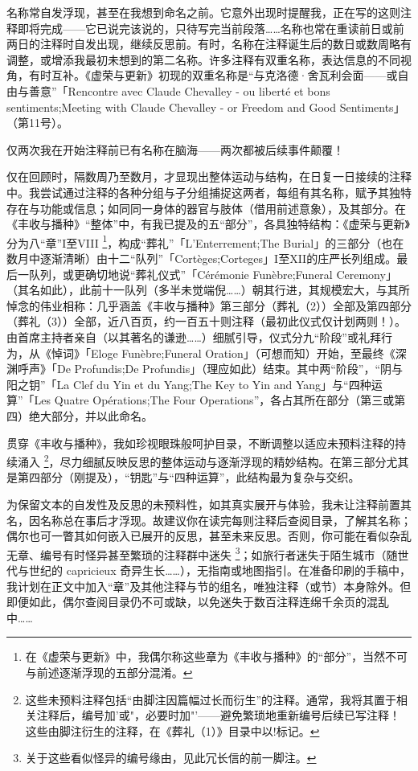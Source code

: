 名称常自发浮现，甚至在我想到命名之前。它意外出现时提醒我，正在写的这则注释即将完成——它已说完该说的，只待写完当前段落……名称也常在重读前日或前两日的注释时自发出现，继续反思前。有时，名称在注释诞生后的数日或数周略有调整，或增添我最初未想到的第二名称。许多注释有双重名称，表达信息的不同视角，有时互补。《虚荣与更新》初现的双重名称是“与克洛德·舍瓦利会面——或自由与善意”「Rencontre avec Claude Chevalley - ou liberté et bons sentiments;Meeting with Claude Chevalley - or Freedom and Good Sentiments」（第11号）。

仅两次我在开始注释前已有名称在脑海——两次都被后续事件颠覆！

仅在回顾时，隔数周乃至数月，才显现出整体运动与结构，在日复一日接续的注释中。我尝试通过注释的各种分组与子分组捕捉这两者，每组有其名称，赋予其独特存在与功能或信息；如同同一身体的器官与肢体（借用前述意象），及其部分。在《丰收与播种》“整体”中，有我已提及的五“部分”，各具独特结构：《虚荣与更新》分为八“章”I至VIII \footnote{在《虚荣与更新》中，我偶尔称这些章为《丰收与播种》的“部分”，当然不可与前述逐渐浮现的五部分混淆。}，构成“葬礼”「L'Enterrement;The Burial」的三部分（也在数月中逐渐清晰）由十二“队列”「Cortèges;Corteges」I至XII的庄严长列组成。最后一队列，或更确切地说“葬礼仪式”「Cérémonie Funèbre;Funeral Ceremony」（其名如此），此前十一队列（多半未觉端倪……）朝其行进，其规模宏大，与其所悼念的伟业相称：几乎涵盖《丰收与播种》第三部分（葬礼（2））全部及第四部分（葬礼（3））全部，近八百页，约一百五十则注释（最初此仪式仅计划两则！）。由首席主持者亲自（以其著名的谦逊……）细腻引导，仪式分九“阶段”或礼拜行为，从《悼词》「Eloge Funèbre;Funeral Oration」（可想而知）开始，至最终《深渊呼声》「De Profundis;De Profundis」（理应如此）结束。其中两“阶段”，“阴与阳之钥”「La Clef du Yin et du Yang;The Key to Yin and Yang」与“四种运算”「Les Quatre Opérations;The Four Operations”，各占其所在部分（第三或第四）绝大部分，并以此命名。

贯穿《丰收与播种》，我如珍视眼珠般呵护目录，不断调整以适应未预料注释的持续涌入 \footnote{这些未预料注释包括“由脚注因篇幅过长而衍生”的注释。通常，我将其置于相关注释后，编号加'或"，必要时加"'——避免繁琐地重新编号后续已写注释！这些由脚注衍生的注释，在《葬礼（1）》目录中以!标记。}，尽力细腻反映反思的整体运动与逐渐浮现的精妙结构。在第三部分尤其是第四部分（刚提及），“钥匙”与“四种运算”，此结构最为复杂与交织。

为保留文本的自发性及反思的未预料性，如其真实展开与体验，我未让注释前置其名，因名称总在事后才浮现。故建议你在读完每则注释后查阅目录，了解其名称；偶尔也可一瞥其如何嵌入已展开的反思，甚至未来反思。否则，你可能在看似杂乱无章、编号有时怪异甚至繁琐的注释群中迷失 \footnote{关于这些看似怪异的编号缘由，见此冗长信的前一脚注。}；如旅行者迷失于陌生城市（随世代与世纪的 capricieux 奇异生长……），无指南或地图指引。在准备印刷的手稿中，我计划在正文中加入“章”及其他注释与节的组名，唯独注释（或节）本身除外。但即便如此，偶尔查阅目录仍不可或缺，以免迷失于数百注释连绵千余页的混乱中……